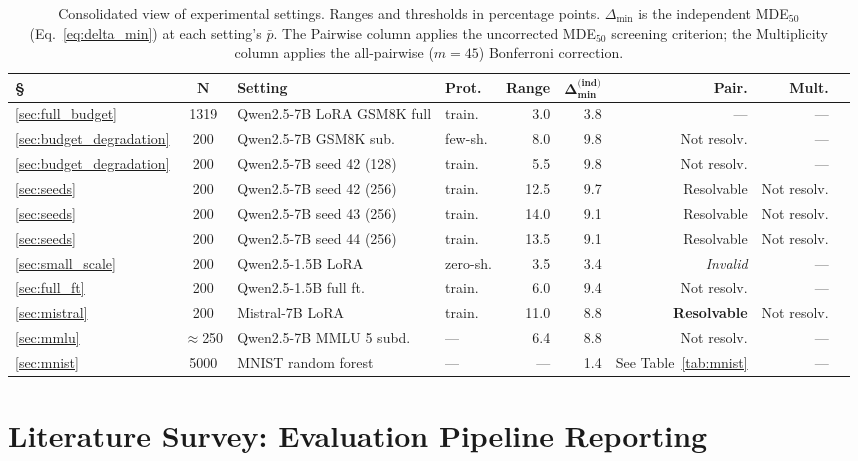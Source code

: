 \documentclass[pdflatex,sn-mathphys-ay,oneside]{sn-jnl}
\theoremstyle{thmstylethree}
\begin{document}
\begin{table}[t]
\centering
\caption{Consolidated view of experimental settings. Ranges and thresholds in percentage points. $\Delta_{\min}$ is the independent MDE$_{50}$ (Eq.~\ref{eq:delta_min}) at each setting's $\bar{p}$. The Pairwise column applies the uncorrected MDE$_{50}$ screening criterion; the Multiplicity column applies the all-pairwise ($m=45$) Bonferroni correction.}
\label{tab:all_settings}
\centering
\small
\setlength{\tabcolsep}{2.5pt}
\begin{tabular}{lcp{24mm}lrrrrl}\toprule
\textbf{\S} & $\bm{N}$ & \textbf{Setting} & \textbf{Prot.} & \textbf{Range} & $\bm{\Delta_{\min}^{\text{(ind)}}}$ & \textbf{Pair.} & \textbf{Mult.} \\\midrule
\ref{sec:full_budget} & 1319 & Qwen2.5-7B LoRA GSM8K full & train. & 3.0 & 3.8 & --- & --- \\
\ref{sec:budget_degradation} & 200 & Qwen2.5-7B GSM8K sub. & few-sh. & 8.0 & 9.8 & Not resolv. & --- \\
\ref{sec:budget_degradation} & 200 & Qwen2.5-7B seed 42 (128) & train. & 5.5 & 9.8 & Not resolv. & --- \\
\ref{sec:seeds} & 200 & Qwen2.5-7B seed 42 (256) & train. & 12.5 & 9.7 & Resolvable & Not resolv. \\
\ref{sec:seeds} & 200 & Qwen2.5-7B seed 43 (256) & train. & 14.0 & 9.1 & Resolvable & Not resolv. \\
\ref{sec:seeds} & 200 & Qwen2.5-7B seed 44 (256) & train. & 13.5 & 9.1 & Resolvable & Not resolv. \\
\ref{sec:small_scale} & 200 & Qwen2.5-1.5B LoRA & zero-sh. & 3.5 & 3.4 & \emph{Invalid} & --- \\
\ref{sec:full_ft} & 200 & Qwen2.5-1.5B full ft. & train. & 6.0 & 9.4 & Not resolv. & --- \\
\ref{sec:mistral} & 200 & Mistral-7B LoRA & train. & 11.0 & 8.8 & \textbf{Resolvable} & Not resolv. \\
\ref{sec:mmlu} & $\approx$250 & Qwen2.5-7B MMLU 5 subd. & --- & 6.4 & 8.8 & Not resolv. & --- \\
\ref{sec:mnist} & 5000 & MNIST random forest & --- & --- & 1.4 & See Table~\ref{tab:mnist} & --- \\
\bottomrule
\end{tabular}
\end{table}

\section{Literature Survey: Evaluation Pipeline Reporting}\label{sec:survey}
\end{document}
